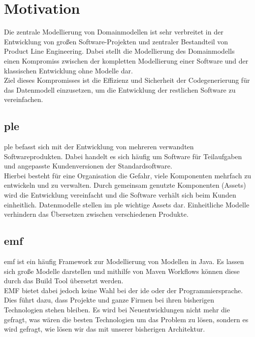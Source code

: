 \documentclass[./einleitung.tex]{subfiles}
\begin{document}
\section{Motivation}
Die zentrale Modellierung von Domainmodellen ist sehr verbreitet in der Entwicklung von großen Software-Projekten und zentraler Bestandteil von Product Line Engineering.
Dabei stellt die Modellierung des Domainmodells einen Kompromiss zwischen der kompletten Modellierung einer Software und der klassischen Entwicklung ohne Modelle dar. \\
Ziel dieses Kompromisses ist die Effizienz und Sicherheit der Codegenerierung für das Datenmodell einzusetzen, um die Entwicklung der restlichen Software zu vereinfachen.

\subsection{\acrfull{ple}}
\acrshort{ple} befasst sich mit der Entwicklung von mehreren verwandten Softwareprodukten.
Dabei handelt es sich häufig um Software für Teilaufgaben und angepasste Kundenversionen der Standardsoftware. \\
Hierbei besteht für eine Organisation die Gefahr, viele Komponenten mehrfach zu entwickeln und zu verwalten.
Durch gemeinsam genutzte Komponenten (Assets) wird die Entwicklung vereinfacht und die Software verhält sich beim Kunden einheitlich.
Datenmodelle stellen im \acrshort{ple} wichtige Assets dar.
Einheitliche Modelle verhindern das Übersetzen zwischen verschiedenen Produkte.

\subsection{\acrshort{emf}}
\acrfull{emf} ist ein häufig Framework zur Modellierung von Modellen in Java.
Es lassen sich große Modelle darstellen und mithilfe von Maven Workflows können diese durch das Build Tool übersetzt werden. \\
EMF bietet dabei jedoch keine Wahl bei der \acrshort{ide} oder der Programmiersprache.
Dies führt dazu, dass Projekte und ganze Firmen bei ihren bisherigen Technologien stehen bleiben.
Es wird bei Neuentwicklungen nicht mehr die gefragt, was wären die besten Technologien um das Problem zu lösen, sondern es wird gefragt, wie lösen wir das mit unserer bisherigen Architektur.
\end{document}
